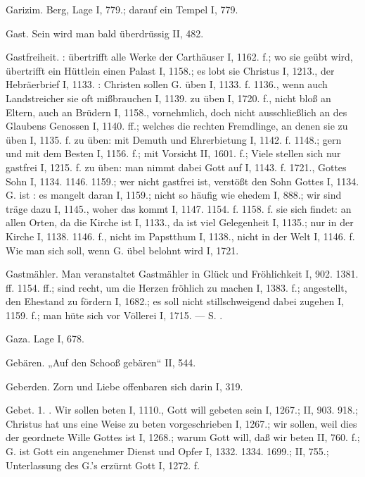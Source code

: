 Garizim. Berg, Lage I, 779.; darauf ein Tempel I, 779.

Gast. Sein wird man bald überdrüssig II, 482.

Gastfreiheit. : übertrifft alle Werke der Carthäuser I, 1162. f.; wo sie geübt wird, übertrifft ein Hüttlein einen Palast I, 1158.; es lobt sie Christus I, 1213., der Hebräerbrief I, 1133. : Christen sollen G. üben I, 1133. f. 1136., wenn auch Landstreicher sie oft mißbrauchen I, 1139.  zu üben I, 1720. f., nicht bloß an Eltern, auch an Brüdern I, 1158., vornehmlich, doch nicht ausschließlich an des Glaubens Genossen I, 1140. ff.; welches die rechten Fremdlinge, an denen sie zu üben I, 1135. f.  zu üben: mit Demuth und Ehrerbietung I, 1142. f. 1148.; gern und mit dem Besten I, 1156. f.; mit Vorsicht II, 1601. f.; Viele stellen sich nur gastfrei I, 1215. f.  zu üben: man nimmt dabei Gott auf I, 1143. f. 1721., Gottes Sohn I, 1134. 1146. 1159.; wer nicht gastfrei ist, verstößt den Sohn Gottes I, 1134. G. ist : es mangelt daran I, 1159.; nicht so häufig wie ehedem I, 888.; wir sind träge dazu I, 1145., woher das kommt I, 1147. 1154. f. 1158. f.  sie sich findet: an allen Orten, da die Kirche ist I, 1133., da ist viel Gelegenheit I, 1135.; nur in der Kirche I, 1138. 1146. f., nicht im Papstthum I, 1138., nicht in der Welt I, 1146. f. Wie man sich  soll, wenn G. übel belohnt wird I, 1721.

Gastmähler. Man veranstaltet Gastmähler in Glück und Fröhlichkeit I, 902. 1381. ff. 1154. ff.; sind recht, um die Herzen fröhlich zu machen I, 1383. f.; angestellt, den Ehestand zu fördern I, 1682.; es soll nicht stillschweigend dabei zugehen I, 1159. f.; man hüte sich vor Völlerei I, 1715. — S. .

Gaza. Lage I, 678.

Gebären. „Auf den Schooß gebären“ II, 544.

Geberden. Zorn und Liebe offenbaren sich darin I, 319.

Gebet. 1. . Wir sollen beten I, 1110., Gott will gebeten sein I, 1267.; II, 903. 918.; Christus hat uns eine Weise zu beten vorgeschrieben I, 1267.; wir sollen, weil dies der geordnete Wille Gottes ist I, 1268.; warum Gott will, daß wir beten II, 760. f.; G. ist Gott
ein angenehmer Dienst und Opfer I, 1332. 1334. 1699.; II, 755.; Unterlassung des G.’s erzürnt Gott I, 1272. f.

